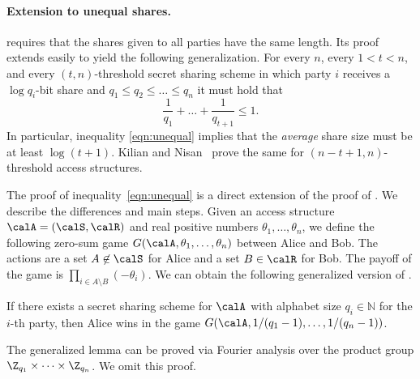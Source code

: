 \documentclass{toc}
\begin{document}
\paragraph{Extension to unequal shares.}
 requires that the shares given to all parties have the same length. Its proof extends easily to yield the following
generalization.  %
For every $n$, every $1 < t < n$, and every $(t, n)$-threshold secret sharing scheme in which party $i$ receives a $\log q_i$-bit share and $q_1 \leq q_2 \leq \dots \leq q_n$ it must hold that
\begin{equation}
\label{eqn:unequal}
\frac{1}{q_1} + \dots + \frac{1}{q_{t+1}} \leq 1.
\end{equation}
In particular, inequality \eqref{eqn:unequal} implies that the \emph{average}
share size must be at least $\log{(t+1)}$.   Kilian and Nisan~\cite{KilianN90}
prove the same for $(n - t + 1, n)$-threshold access structures.

The proof of inequality~\eqref{eqn:unequal} is a direct extension of the proof of .     We describe the differences and main steps.
Given an access structure $\calA = (\calS, \calR)$ and
real positive numbers $\theta_1,\dots, \theta_n$, we define the following zero-sum game $G(\calA, \theta_1,\dots,\theta_n)$ between Alice and Bob. The actions are a set $A \not\in \calS$ for Alice and a set $B
\in \calR$ for Bob.  The payoff of the game is $\prod_{i \in A \setminus B} (-\theta_i)$.  
We can obtain the following generalized version of .

\begin{lemma}
\label{lemma:main_ave}
If there exists a secret sharing scheme for $\calA$ with alphabet size $q_i\in\mathbb{N}$ for the $i$-th party,  then Alice wins in the game $G(\calA, 1/(q_1-1),\dots,1/(q_n-1))$.
\end{lemma}

The generalized lemma can be proved via Fourier analysis over the product group $\Z_{q_1} \times \cdots \times \Z_{q_n}$.    We omit this proof.
\end{document}
